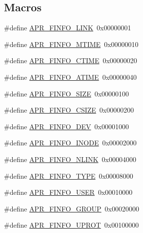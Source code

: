\subsection*{Macros}
\begin{DoxyCompactItemize}
\item 
\#define \hyperlink{group__apr__file__stat_ga9b0c1d02401b845f928f836fdd3c6712}{A\+P\+R\+\_\+\+F\+I\+N\+F\+O\+\_\+\+L\+I\+NK}~0x00000001
\item 
\#define \hyperlink{group__apr__file__stat_ga992ce1f4f75d519fd2a9d241c5a12515}{A\+P\+R\+\_\+\+F\+I\+N\+F\+O\+\_\+\+M\+T\+I\+ME}~0x00000010
\item 
\#define \hyperlink{group__apr__file__stat_ga98bef78baf71fa63b06352704f128bca}{A\+P\+R\+\_\+\+F\+I\+N\+F\+O\+\_\+\+C\+T\+I\+ME}~0x00000020
\item 
\#define \hyperlink{group__apr__file__stat_ga17d7656d02a35ffc05afe22032a8da15}{A\+P\+R\+\_\+\+F\+I\+N\+F\+O\+\_\+\+A\+T\+I\+ME}~0x00000040
\item 
\#define \hyperlink{group__apr__file__stat_gadf72493da450c0b1e3d279e98a973120}{A\+P\+R\+\_\+\+F\+I\+N\+F\+O\+\_\+\+S\+I\+ZE}~0x00000100
\item 
\#define \hyperlink{group__apr__file__stat_gaf87a09b89935d730cb1ade80d5b6ada0}{A\+P\+R\+\_\+\+F\+I\+N\+F\+O\+\_\+\+C\+S\+I\+ZE}~0x00000200
\item 
\#define \hyperlink{group__apr__file__stat_ga0890d31145211f62d38dd8e444b5660a}{A\+P\+R\+\_\+\+F\+I\+N\+F\+O\+\_\+\+D\+EV}~0x00001000
\item 
\#define \hyperlink{group__apr__file__stat_ga4fee7341395912db501b40de81dbba26}{A\+P\+R\+\_\+\+F\+I\+N\+F\+O\+\_\+\+I\+N\+O\+DE}~0x00002000
\item 
\#define \hyperlink{group__apr__file__stat_gabb2ba05b8ed45e59b1f06e1b7b4c91c2}{A\+P\+R\+\_\+\+F\+I\+N\+F\+O\+\_\+\+N\+L\+I\+NK}~0x00004000
\item 
\#define \hyperlink{group__apr__file__stat_gad5d25f25527ee77c08bb20aae141306c}{A\+P\+R\+\_\+\+F\+I\+N\+F\+O\+\_\+\+T\+Y\+PE}~0x00008000
\item 
\#define \hyperlink{group__apr__file__stat_ga599d92111a5cca379a06980025044e12}{A\+P\+R\+\_\+\+F\+I\+N\+F\+O\+\_\+\+U\+S\+ER}~0x00010000
\item 
\#define \hyperlink{group__apr__file__stat_ga8420798139d34a88678498aa848803ff}{A\+P\+R\+\_\+\+F\+I\+N\+F\+O\+\_\+\+G\+R\+O\+UP}~0x00020000
\item 
\#define \hyperlink{group__apr__file__stat_gac85e4335fcf91881b11b3e8a4b224aca}{A\+P\+R\+\_\+\+F\+I\+N\+F\+O\+\_\+\+U\+P\+R\+OT}~0x00100000

\end{DoxyCompactItemize}

